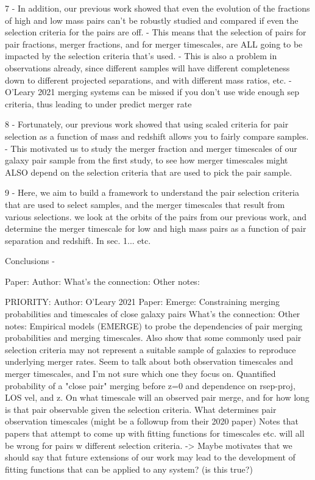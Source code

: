7 - In addition, our previous work showed that even the evolution of the fractions of high and low mass pairs can't be robustly studied and compared if even the selection criteria for the pairs are off. 
    - This means that the selection of pairs for pair fractions, merger fractions, and for merger timescales, are ALL going to be impacted by the selection criteria that's used. 
    - This is also a problem in observations already, since different samples will have different completeness down to different projected separations, and with different mass ratios, etc. 
    - O'Leary 2021 merging systems can be missed if you don't use wide enough sep criteria, thus leading to under predict merger rate

8 - Fortunately, our previous work showed that using scaled criteria for pair selection as a function of mass and redshift allows you to fairly compare samples. 
    - This motivated us to study the merger fraction and merger timescales of our galaxy pair sample from the first study, to see how merger timescales might ALSO depend on the selection criteria that are used to pick the pair sample. 


9 - Here, we aim to build a framework to understand the pair selection criteria that are used to select samples, and the merger timescales that result from various selections.  we look at the orbits of the pairs from our previous work, and determine the merger timescale for low and high mass pairs as a function of pair separation and redshift. In sec. 1... etc. 






Conclusions - 






Paper:
Author:
What's the connection:
Other notes:

PRIORITY: 
    Author: O'Leary 2021
    Paper: Emerge: Constraining merging probabilities and timescales of close galaxy pairs 
    What's the connection:
    Other notes: 
    Empirical models (EMERGE) to probe the dependencies of pair merging probabilities and merging timescales. Also show that some commonly used pair selection criteria may not represent a suitable sample of galaxies to reproduce underlying merger rates. Seem to talk about both observation timescales and merger timescales, and I'm not sure which one they focus on.
    Quantified probability of a "close pair" merging before z=0 and dependence on rsep-proj, LOS vel, and z. 
    On what timescale will an observed pair merge, and for how long is that pair observable given the selection criteria. 
    What determines pair observation timescales (might be a followup from their 2020 paper) 
    Notes that papers that attempt to come up with fitting functions for timescales etc. will all be wrong for pairs w different selection criteria.
    -> Maybe motivates that we should say that future extensions of our work may lead to the development of fitting functions that can be applied to any system? (is this true?)
    

